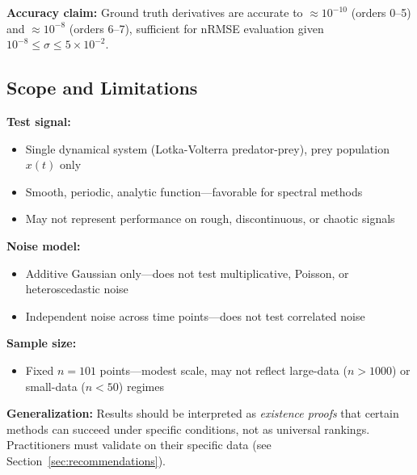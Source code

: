 \textbf{Accuracy claim:} Ground truth derivatives are accurate to $\approx 10^{-10}$ (orders 0--5) and $\approx 10^{-8}$ (orders 6--7), sufficient for nRMSE evaluation given $10^{-8} \leq \sigma \leq 5 \times 10^{-2}$.

\subsection{Scope and Limitations}
\label{sec:scope}

\textbf{Test signal:}
\begin{itemize}
    \item Single dynamical system (Lotka-Volterra predator-prey), prey population $x(t)$ only
    \item Smooth, periodic, analytic function—favorable for spectral methods
    \item May not represent performance on rough, discontinuous, or chaotic signals
\end{itemize}

\textbf{Noise model:}
\begin{itemize}
    \item Additive Gaussian only—does not test multiplicative, Poisson, or heteroscedastic noise
    \item Independent noise across time points—does not test correlated noise
\end{itemize}

\textbf{Sample size:}
\begin{itemize}
    \item Fixed $n=101$ points—modest scale, may not reflect large-data ($n > 1000$) or small-data ($n < 50$) regimes
\end{itemize}

\textbf{Generalization:} Results should be interpreted as \textit{existence proofs} that certain methods can succeed under specific conditions, not as universal rankings. Practitioners must validate on their specific data (see Section~\ref{sec:recommendations}).
